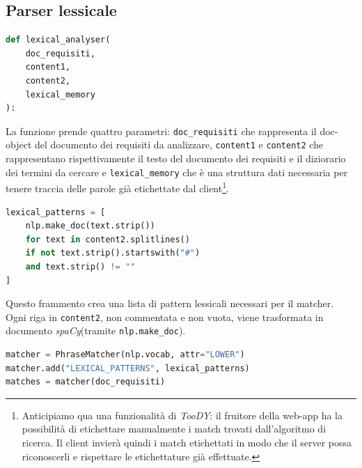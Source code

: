 \documentclass[12pt]{report}
\newcommand{\toody}{\textsl{TooDY}\xspace}
\newcommand{\spacy}{\textsl{spaCy}\xspace}
\begin{document}
\subsection{Parser lessicale}
\label{subsec:parser_lessicale}

\begin{mdframed}
\small
\begin{lstlisting}[language=Python]
def lexical_analyser(
    doc_requisiti,
    content1,
    content2,
    lexical_memory
):
\end{lstlisting}
\end{mdframed}

\noindent La funzione prende quattro parametri: \texttt{doc\_requisiti} che rappresenta il doc-object del documento dei requisiti da analizzare, \texttt{content1} e \texttt{content2} che rappresentano rispettivamente il testo del documento dei requisiti e il diziorario dei termini da cercare e \texttt{lexical\_memory} che è una struttura dati necessaria per tenere traccia delle parole già etichettate dal client\footnote{Anticipiamo qua una funzionalità di \toody: il fruitore della web-app ha la possibilità di etichettare manualmente i match trovati dall'algoritmo di ricerca. Il client invierà quindi i match etichettati in modo che il server possa riconoscerli e rispettare le etichettature già effettuate.}.


\begin{mdframed}
\small
\begin{lstlisting}[language=Python]
lexical_patterns = [
    nlp.make_doc(text.strip())
    for text in content2.splitlines()
    if not text.strip().startswith("#")
    and text.strip() != ""
]
\end{lstlisting}
\end{mdframed}

\noindent Questo frammento crea una lista di pattern lessicali necessari per il matcher. Ogni riga in \texttt{content2}, non commentata e non vuota, viene trasformata in documento \spacy (tramite \texttt{nlp.make\_doc}).


\begin{mdframed}
\small
\begin{lstlisting}[language=Python]
matcher = PhraseMatcher(nlp.vocab, attr="LOWER")
matcher.add("LEXICAL_PATTERNS", lexical_patterns)
matches = matcher(doc_requisiti)
\end{lstlisting}
\end{mdframed}
\end{document}
